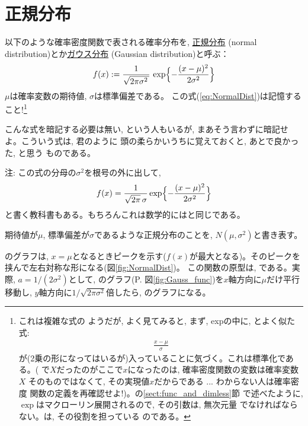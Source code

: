 \section{正規分布}

以下のような確率密度関数で表される確率分布を, 
\underline{正規分布}  (normal distribution)とか\underline{ガウス分布}
 (Gaussian distribution)と呼ぶ：
\begin{eqnarray}
f(x):=\frac{1}{\sqrt{2\pi \sigma^2\,}}\,\exp\Bigl\{-\frac{(x-\mu)^2}{2\sigma^2}\Bigr\}
\label{eq:NormalDist}\end{eqnarray}
$\mu$は確率変数の期待値, $\sigma$は標準偏差である。
この式(\ref{eq:NormalDist})は記憶すること!\footnote{これは複雑な式の
ようだが, よく見てみると, まず, expの中に, とよく似た式:
\begin{eqnarray}
\frac{x-\mu}{\sigma}\label{eq:stat_standardize_x}
\end{eqnarray}
が(2乗の形になってはいるが)入っていることに気づく。これは標準化である。(
で$X$だったのがここで$x$になったのは, 確率密度関数の変数は確率変数$X$
そのものではなくて, その実現値$x$だからである ... わからない人は確率密度
関数の定義を再確認せよ!)。の\ref{sect:func_and_dimless}節
で述べたように, $\exp$はマクローリン展開されるので, その引数は, 無次元量
でなければならない。は, その役割を担っている
のである。}

こんな式を暗記する必要は無い, という人もいるが, 
まあそう言わずに暗記せよ。こういう式は, 君のように
頭の柔らかいうちに覚えておくと, あとで良かった, と思う
ものである。

{\small 注: この式の分母の$\sigma^2$を根号の外に出して, 
\begin{eqnarray}
f(x)=\frac{1}{\sqrt{2\pi}\,\sigma}{\,\exp\Bigl\{-\frac{(x-\mu)^2}{2\sigma^2}\Bigr\}}
\end{eqnarray}
と書く教科書もある。もちろんこれは数学的にはと同じである。\\}

期待値が$\mu$, 標準偏差が$\sigma$であるような正規分布のことを, $N(\mu,\sigma^2)$と書き表す。

のグラフは, $x=\mu$となるときピークを示す($f(x)$が最大となる)。そのピークを
挟んで左右対称な形になる(図\ref{fig:NormalDist})。%
この関数の原型は, である。実際, $a=1/(2\sigma^2)$として, 
のグラフ(P.\pageref{fig:Gauss_func} 図\ref{fig:Gauss_func})を$x$軸方向に$\mu$だけ平行移動し, 
$y$軸方向に$1/\sqrt{2\pi\sigma^2}$倍したら, のグラフになる。

